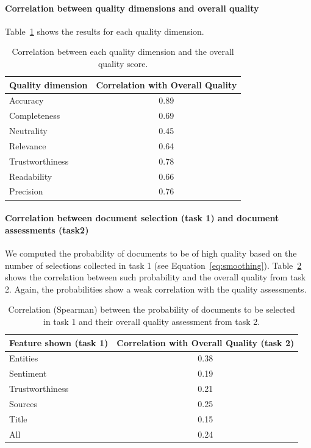 \documentclass{llncs}
\begin{document}
\paragraph{Correlation between quality dimensions and overall quality}

Table~\ref{tab:corrm} shows the results for each quality dimension.
\begin{table}
\centering
\caption{Correlation between each quality dimension and the overall quality score.\label{tab:corrm}}
\begin{tabular}{|l|c|}
\hline
{\bf Quality dimension} & {\bf Correlation with Overall Quality} \\
\hline
Accuracy         &      0.89\\ \hline
Completeness     &      0.69\\ \hline  
Neutrality       &      0.45\\ \hline  
Relevance        &      0.64\\ \hline  
Trustworthiness  &      0.78\\ \hline  
Readability      &      0.66\\ \hline 
Precision        &      0.76\\ \hline 
\end{tabular}

\end{table}

\paragraph{Correlation between document selection (task 1) and document assessments (task2)}
We computed the probability of documents to be of high quality based on the number of selections collected in task 1 (see Equation~\eqref{eq:smoothing}).
Table~\ref{tab:t1t2corrm} shows the correlation between such probability and the overall quality from task 2. Again, the probabilities show a weak correlation with the quality assessments.

\begin{table}
\centering
\caption{Correlation (Spearman) between the probability of documents to be selected in task 1 and their overall quality assessment from task 2.\label{tab:t1t2corrm}}
\begin{tabular}{|l|c|}
\hline
{\bf Feature shown (task 1)} & {\bf Correlation with Overall Quality (task 2)}  \\
\hline
Entities & 0.38 \\ \hline
Sentiment & 0.19 \\ \hline
Trustworthiness & 0.21 \\ \hline
Sources & 0.25 \\ \hline
Title & 0.15 \\ \hline
All & 0.24 \\ \hline
\end{tabular}
\end{table}
\end{document}
